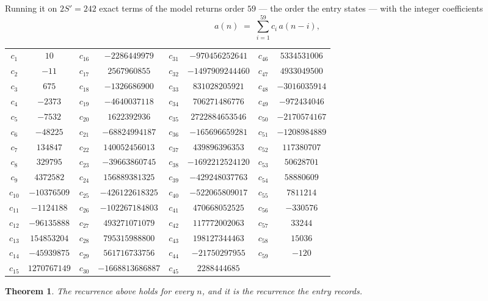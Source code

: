 \documentclass[11pt,a4paper]{article}
\theoremstyle{plain}
\newtheorem{theorem}{Theorem}
\theoremstyle{definition}
\begin{document}
Running it on $2S'=242$ exact terms of the model returns order $59$ --- the order the
entry states --- with the integer coefficients
\[
a(n)\;=\;\sum_{i=1}^{59}c_i\,a(n-i),
\]
\begin{center}\small
\begin{tabular}{cccccccc}
$c_{1}$ & $10$ & $c_{16}$ & $-2286449979$ & $c_{31}$ & $-970456252641$ & $c_{46}$ & $5334531006$ \\
$c_{2}$ & $-11$ & $c_{17}$ & $2567960855$ & $c_{32}$ & $-1497909244460$ & $c_{47}$ & $4933049500$ \\
$c_{3}$ & $675$ & $c_{18}$ & $-1326686900$ & $c_{33}$ & $831028205921$ & $c_{48}$ & $-3016035914$ \\
$c_{4}$ & $-2373$ & $c_{19}$ & $-4640037118$ & $c_{34}$ & $706271486776$ & $c_{49}$ & $-972434046$ \\
$c_{5}$ & $-7532$ & $c_{20}$ & $1622392936$ & $c_{35}$ & $2722884653546$ & $c_{50}$ & $-2170574167$ \\
$c_{6}$ & $-48225$ & $c_{21}$ & $-68824994187$ & $c_{36}$ & $-165696659281$ & $c_{51}$ & $-1208984889$ \\
$c_{7}$ & $134847$ & $c_{22}$ & $140052456013$ & $c_{37}$ & $439896396353$ & $c_{52}$ & $117380707$ \\
$c_{8}$ & $329795$ & $c_{23}$ & $-39663860745$ & $c_{38}$ & $-1692212524120$ & $c_{53}$ & $50628701$ \\
$c_{9}$ & $4372582$ & $c_{24}$ & $156889381325$ & $c_{39}$ & $-429248037763$ & $c_{54}$ & $58880609$ \\
$c_{10}$ & $-10376509$ & $c_{25}$ & $-426122618325$ & $c_{40}$ & $-522065809017$ & $c_{55}$ & $7811214$ \\
$c_{11}$ & $-1124188$ & $c_{26}$ & $-102267184803$ & $c_{41}$ & $470668052525$ & $c_{56}$ & $-330576$ \\
$c_{12}$ & $-96135888$ & $c_{27}$ & $493271071079$ & $c_{42}$ & $117772002063$ & $c_{57}$ & $33244$ \\
$c_{13}$ & $154853204$ & $c_{28}$ & $795315988800$ & $c_{43}$ & $198127344463$ & $c_{58}$ & $15036$ \\
$c_{14}$ & $-45939875$ & $c_{29}$ & $561716733756$ & $c_{44}$ & $-21750297955$ & $c_{59}$ & $-120$ \\
$c_{15}$ & $1270767149$ & $c_{30}$ & $-1668813686887$ & $c_{45}$ & $2288444685$ &  &  \\
\end{tabular}
\end{center}

\begin{theorem}
The recurrence above holds for every $n$, and it is the recurrence the entry records.
\end{theorem}
\end{document}
